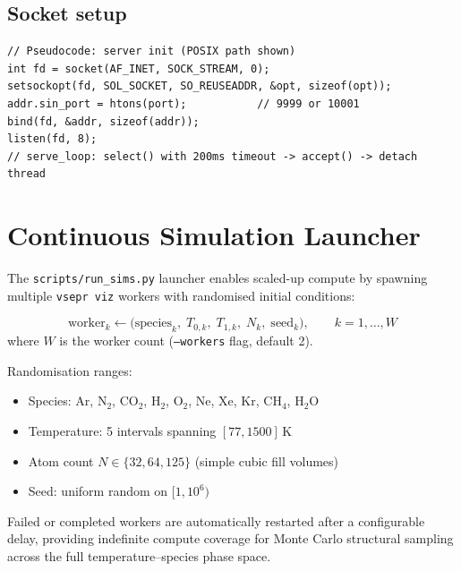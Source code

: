 ﻿\documentclass[11pt]{article}
\begin{document}
\subsection{Socket setup}

\begin{lstlisting}[style=cpp]
// Pseudocode: server init (POSIX path shown)
int fd = socket(AF_INET, SOCK_STREAM, 0);
setsockopt(fd, SOL_SOCKET, SO_REUSEADDR, &opt, sizeof(opt));
addr.sin_port = htons(port);           // 9999 or 10001
bind(fd, &addr, sizeof(addr));
listen(fd, 8);
// serve_loop: select() with 200ms timeout -> accept() -> detach thread
\end{lstlisting}

\section{Continuous Simulation Launcher}
\label{sec:launcher}

The \texttt{scripts/run\_sims.py} launcher enables scaled-up compute by
spawning multiple \texttt{vsepr~viz} workers with randomised initial conditions:

\begin{equation}
  \text{worker}_k \leftarrow \bigl(\text{species}_k,\;T_{0,k},\;T_{1,k},\;N_k,\;\mathrm{seed}_k\bigr),
  \qquad k = 1,\ldots,W
\end{equation}
where $W$ is the worker count (\texttt{--workers} flag, default 2).

Randomisation ranges:
\begin{itemize}[noitemsep]
  \item Species: Ar, N$_2$, CO$_2$, H$_2$, O$_2$, Ne, Xe, Kr, CH$_4$, H$_2$O
  \item Temperature: 5 intervals spanning $[77, 1500]$\,K
  \item Atom count $N \in \{32, 64, 125\}$ (simple cubic fill volumes)
  \item Seed: uniform random on $[1, 10^6)$
\end{itemize}

Failed or completed workers are automatically restarted after a
configurable delay, providing indefinite compute coverage for Monte Carlo
structural sampling across the full temperature--species phase space.

\end{document}
